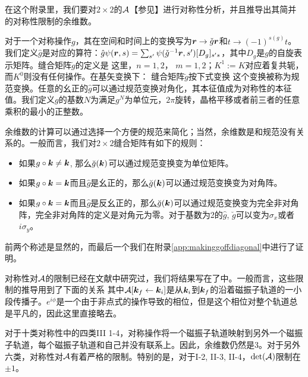 \begin{appendices}
在这个附录里，我们要对$2\times 2$的${\cal A}$【参见】进行对称性分析，并且推导出其简并的对称性限制的余维数。

对于一个对称操作$g$，其在空间和时间上的变换写为$\boldsymbol{r} \rightarrow \check{g} \boldsymbol{r}$和$t\rightarrow (-1)^{s(g)}t$。我们定义$\hat{g}$是对应的算符：$\hat{g} \psi(\boldsymbol{r},s)=\sum_{s'}\psi(\check{g}^{-1} \boldsymbol{r},s')[D_g]_{s's}$，其中$D_g$是$g$的自旋表示矩阵。缝合矩阵$\breve{g}$的定义是
这里，$n=1,2$， $m=1,2$；$K^1:=K$对应着复共轭，而$K^0$则没有任何操作。在基矢变换下： 
缝合矩阵$\breve{g}$按下式变换
这个变换被称为规范变换。任意的幺正的$\hat{g}$可以通过规范变换对角化，其本征值成为对称性的本征值。我们定义$g$的基数$N$为满足$g^N$为单位元，$2\pi$旋转，晶格平移或者前三者的任意乘积的最小的正整数。

余维数的计算可以通过选择一个方便的规范来简化；当然，余维数是和规范没有关系的。一般而言，我们对$2\times 2$缝合矩阵有如下的规则：
\begin{itemize}
\item 如果$g\circ\boldsymbol{k}\ne\boldsymbol{k}$, 那么$\breve{g}(\boldsymbol{k})$可以通过规范变换变为单位矩阵。
\item 如果$g\circ\boldsymbol{k}=\boldsymbol{k}$而且$\hat{g}$是幺正的，那么$\breve{g}(\boldsymbol{k})$可以通过规范变换变为对角阵。
\item 如果$g\circ\boldsymbol{k}=\boldsymbol{k}$而且$\hat{g}$是反幺正的，那么$\breve{g}(\boldsymbol{k})$可以通过规范变换变为完全非对角阵，完全非对角阵的定义是对角元为零。对于基数为2的$\hat{g}$, $\breve{g}$可以变为$\sigma_x$或者$i\sigma_y$。
\end{itemize}
前两个称述是显然的，而最后一个我们在附录\ref{app:makinggoffdiagonal}中进行了证明。

对称性对${\cal A}$的限制已经在文献中研究过，我们将结果写在了中。一般而言，这些限制的推导用到了下面的关系
其中${\cal A}[\boldsymbol{k}_f\leftarrow \boldsymbol{k}_i]$是从$\boldsymbol{k}_i$到$\boldsymbol{k}_f$的沿着磁振子轨道的一小段传播子。$e^{i\phi}$是一个由于非点式的操作导致的相位，但是这个相位对整个轨道总是平凡的\cite{100p}，因此这里直接略去。

对于十类对称性中的四类III 1-4，对称操作将一个磁振子轨道映射到另外一个磁振子轨道，每个磁振子轨道和自己并没有联系上。因此，余维数仍然是3。对于另外六类，对称性对${\cal A}$有着严格的限制。特别的是，对于I-2, II-3, II-4，$\det({\cal A})$限制在$\pm 1$\cite{topoferm,100p}。


\end{appendices}
